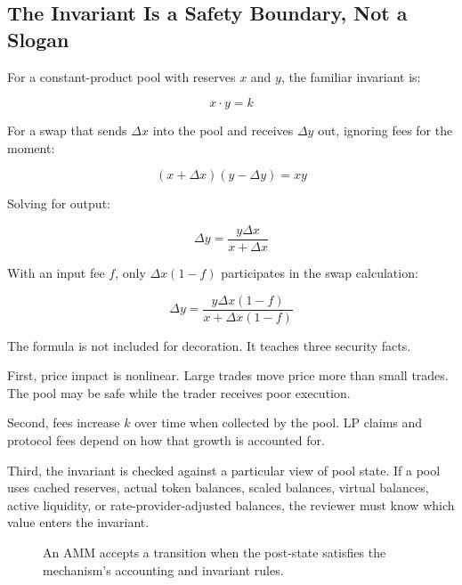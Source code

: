 \subsection{The Invariant Is a Safety Boundary, Not a Slogan}

For a constant-product pool with reserves \(x\) and \(y\), the familiar invariant is:

\[
    x \cdot y = k
\]

For a swap that sends \(\Delta x\) into the pool and receives \(\Delta y\) out, ignoring fees for the moment:

\[
    (x + \Delta x)(y - \Delta y) = x y
\]

Solving for output:

\[
    \Delta y = \frac{y \Delta x}{x + \Delta x}
\]

With an input fee \(f\), only \(\Delta x(1-f)\) participates in the swap calculation:

\[
    \Delta y =
    \frac{y \Delta x(1-f)}
         {x + \Delta x(1-f)}
\]

The formula is not included for decoration. It teaches three security facts.

First, price impact is nonlinear. Large trades move price more than small trades. The pool may be safe while the trader receives poor execution.

Second, fees increase \(k\) over time when collected by the pool. LP claims and protocol fees depend on how that growth is accounted for.

Third, the invariant is checked against a particular view of pool state. If a pool uses cached reserves, actual token balances, scaled balances, virtual balances, active liquidity, or rate-provider-adjusted balances, the reviewer must know which value enters the invariant.

\begin{figure}[htbp]
\centering
{}
\caption{An AMM accepts a transition when the post-state satisfies the mechanism's accounting and invariant rules.}
\end{figure}

